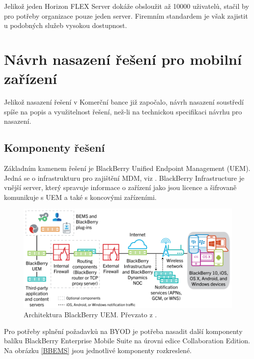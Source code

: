 Jelikož jeden Horizon FLEX Server dokáže obsloužit až 10000 uživatelů, stačil by pro potřeby organizace pouze jeden server. Firemním standardem je však zajistit u podobných služeb vysokou dostupnost.




\section{Návrh nasazení řešení pro mobilní zařízení}
Jelikož nasazení řešení v Komerční bance již započalo, návrh nasazení soustředí spíše na popis a využitelnost řešení, než-li na technickou specifikaci návrhu pro nasazení.

\subsection{Komponenty řešení}


Základním kamenem řešení je BlackBerry Unified Endpoint Management (UEM). %
Jedná se o infrastrukturu pro zajištění MDM, viz \cite{BBUEM}. BlackBerry Infrastructure je vnější server, který spravuje informace o zařízení jako jsou licence a šifrovaně komunikuje s UEM a také s koncovými zařízeními.

\begin{figure}[h!]\label{BBUEM1}
\centering
\includegraphics[width=12cm]{img/BBUEM1}
\caption{Architektura BlackBerry UEM. Převzato z \cite{BBUEM}.}
\end{figure}%

Pro potřeby splnění požadavků na BYOD je potřeba nasadit další komponenty balíku BlackBerry Enterprise Mobile Suite na úrovni edice Collaboration Edition. Na obrázku \ref{BBEMS} jsou jednotlivé komponenty rozkreslené.

